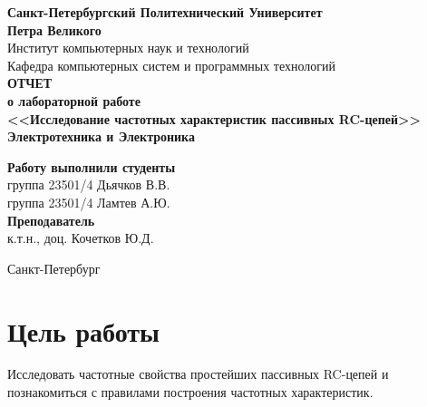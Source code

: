 \documentclass[a4paper,14pt]{extarticle}
\newcommand{\sign}[1][5cm]{\makebox[#1]{\hrulefill}} %
\begin{document}
\begin{titlepage}
\begin{center}
	\textbf{Санкт-Петербургский Политехнический Университет \\Петра Великого}\\[0.3cm]
	\small Институт компьютерных наук и технологий \\[0.3cm]
	\small Кафедра компьютерных систем и программных технологий\\[4cm]
	
	\textbf{ОТЧЕТ}\\ \textbf{о лабораторной работе}\\[0.5cm]
	\textbf{<<Исследование частотных характеристик пассивных RC-цепей>>}\\[0.1cm]
	\textbf{Электротехника и Электроника}\\[10.5cm]
\end{center}

\begin{flushright}
	\begin{minipage}{0.60\textwidth}
		\begin{flushleft}
			\small \textbf{Работу выполнили студенты}\\[3mm]
			\small группа 23501/4 \hspace*{17mm} Дьячков В.В.\\[3mm]
			\small группа 23501/4 \hspace*{17mm} Ламтев А.Ю.\\[5mm]
			
			\small \textbf{Преподаватель}\\[5mm]
		 	\small \sign[3.5cm] \hspace*{8mm} к.т.н., доц. Кочетков Ю.Д.\\[0.5cm]
		\end{flushleft}
	\end{minipage}
\end{flushright}

\vfill

\begin{center}
	\small Санкт-Петербург\\
	\small \the\year
\end{center}
\end{titlepage}

\section{Цель работы}

Исследовать частотные свойства простейших пассивных RC­-цепей и познакомиться с правилами построения частотных характеристик.
\end{document}
